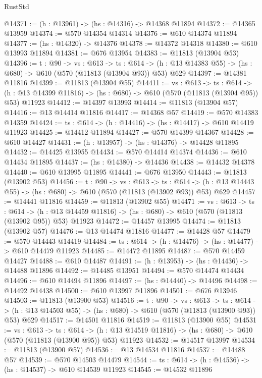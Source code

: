 \begin{lexlean}{RustStd}
\begin{coremodule}
@14371 := (h : @13961) -> (hs : @14316) -> @14368 @11894
@14372 := @14365 @13959
@14374 := @570 @14354 @14314
@14376 := @610 @14374 @11894
@14377 := (hs : @14320) -> @14376
@14378 := @14372 @14318
@14380 := @610 @13993 @11894
@14381 := @676 @13954
@14383 := @11813 (@13904 @53)
@14396 := {t : @90} ->
  {vs : @613} ->
  {ts : @614} -> (h : @13 @14383 @55) -> (hs : @680) -> @610 (@570 (@11813 (@13904 @93)) @53) @629
@14397 := @14381 @11816
@14399 := @11813 (@13904 @55)
@14411 := {vs : @613} ->
  {ts : @614} ->
  (h : @13 @14399 @11816) -> (hs : @680) -> @610 (@570 (@11813 (@13904 @95)) @53) @11923
@14412 := @14397 @13993
@14414 := @11813 (@13904 @57)
@14416 := @13 @14414 @11816
@14417 := @14368 @57
@14419 := @570 @14383 @14359
@14424 := {ts : @614} -> (h : @14416) -> (hs : @14417) -> @610 @14419 @11923
@14425 := @14412 @11894
@14427 := @570 @14399 @14367
@14428 := @610 @14427
@14431 := (h : @13957) -> (hs : @14376) -> @14428 @11895
@14432 := @14425 @13955
@14434 := @570 @14414 @14374
@14436 := @610 @14434 @11895
@14437 := (hs : @14380) -> @14436
@14438 := @14432 @14378
@14440 := @610 @13995 @11895
@14441 := @676 @13950
@14443 := @11813 (@13902 @53)
@14456 := {t : @90} ->
  {vs : @613} ->
  {ts : @614} -> (h : @13 @14443 @55) -> (hs : @680) -> @610 (@570 (@11813 (@13902 @93)) @53) @629
@14457 := @14441 @11816
@14459 := @11813 (@13902 @55)
@14471 := {vs : @613} ->
  {ts : @614} ->
  (h : @13 @14459 @11816) -> (hs : @680) -> @610 (@570 (@11813 (@13902 @95)) @53) @11923
@14472 := @14457 @13995
@14474 := @11813 (@13902 @57)
@14476 := @13 @14474 @11816
@14477 := @14428 @57
@14479 := @570 @14443 @14419
@14484 := {ts : @614} -> (h : @14476) -> (hs : @14477) -> @610 @14479 @11923
@14485 := @14472 @11895
@14487 := @570 @14459 @14427
@14488 := @610 @14487
@14491 := (h : @13953) -> (hs : @14436) -> @14488 @11896
@14492 := @14485 @13951
@14494 := @570 @14474 @14434
@14496 := @610 @14494 @11896
@14497 := (hs : @14440) -> @14496
@14498 := @14492 @14438
@14500 := @610 @13997 @11896
@14501 := @676 @13946
@14503 := @11813 (@13900 @53)
@14516 := {t : @90} ->
  {vs : @613} ->
  {ts : @614} -> (h : @13 @14503 @55) -> (hs : @680) -> @610 (@570 (@11813 (@13900 @93)) @53) @629
@14517 := @14501 @11816
@14519 := @11813 (@13900 @55)
@14531 := {vs : @613} ->
  {ts : @614} ->
  (h : @13 @14519 @11816) -> (hs : @680) -> @610 (@570 (@11813 (@13900 @95)) @53) @11923
@14532 := @14517 @13997
@14534 := @11813 (@13900 @57)
@14536 := @13 @14534 @11816
@14537 := @14488 @57
@14539 := @570 @14503 @14479
@14544 := {ts : @614} -> (h : @14536) -> (hs : @14537) -> @610 @14539 @11923
@14545 := @14532 @11896

\end{coremodule}
\end{lexlean}
